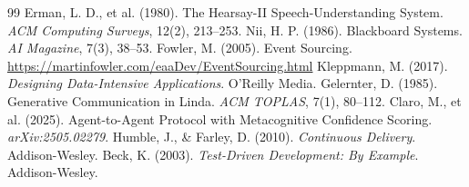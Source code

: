 \begin{thebibliography}{99}
 Erman, L. D., et al. (1980). The Hearsay-II Speech-Understanding System. \textit{ACM Computing Surveys}, 12(2), 213--253. 
 Nii, H. P. (1986). Blackboard Systems. \textit{AI Magazine}, 7(3), 38--53.
 Fowler, M. (2005). Event Sourcing. \url{https://martinfowler.com/eaaDev/EventSourcing.html}
 Kleppmann, M. (2017). \textit{Designing Data-Intensive Applications}. O'Reilly Media.
 Gelernter, D. (1985). Generative Communication in Linda. \textit{ACM TOPLAS}, 7(1), 80--112. 
 Claro, M., et al. (2025). Agent-to-Agent Protocol with Metacognitive Confidence Scoring. \textit{arXiv:2505.02279}. 
 Humble, J., \& Farley, D. (2010). \textit{Continuous Delivery}. Addison-Wesley.
 Beck, K. (2003). \textit{Test-Driven Development: By Example}. Addison-Wesley.
\end{thebibliography}
